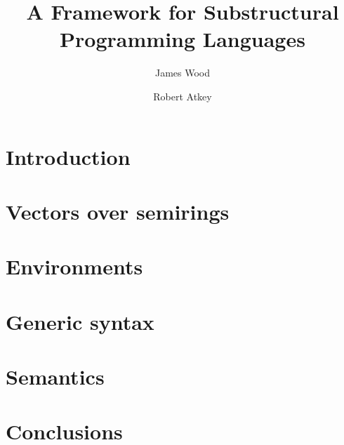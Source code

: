 \documentclass[sigplan,10pt,anonymous,review]{acmart}
\begin{document}
\title{A Framework for Substructural Programming Languages}

\author{James Wood}

\author{Robert Atkey}

\maketitle

\section{Introduction}\label{sec:intro}

\section{Vectors over semirings}\label{sec:algebra}


\section{Environments}\label{sec:env}


\section{Generic syntax}\label{sec:syntax}


\section{Semantics}\label{sec:semantics}

\section{Conclusions}\label{sec:conc}
\end{document}

